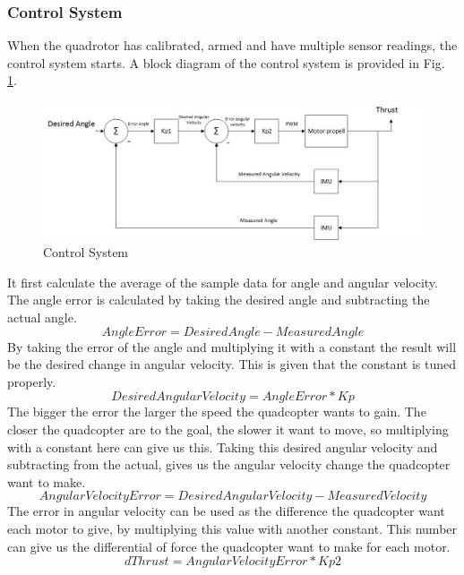 \subsubsection{Control System}
When the quadrotor has calibrated, armed and have multiple sensor readings, the control system starts. A block diagram of the control system is provided in Fig. \ref{fig:dir}.
\begin{figure}[H]
          \centering
            \includegraphics[scale = 0.62]{VAPIQ-PICTURES/CSBD.jpg}
                \caption{Control System}
                \label{CSBD}
            \label{fig:dir}
\end{figure} 
\noindent
It first calculate the average of the sample data for angle and angular velocity. The angle error is calculated by taking the desired angle and subtracting the actual angle. 
\begin{equation}
   Angle Error = Desired Angle - Measured Angle
\end{equation}
\noindent
By taking the error of the angle and multiplying it with a constant the result will be the desired change in angular velocity. This is given that the constant is tuned properly.
\begin{equation}
   Desired Angular Velocity = Angle Error * Kp
\end{equation}
\noindent
The bigger the error the larger the speed the quadcopter wants to gain. The closer the quadcopter are to the goal, the slower it want to move, so multiplying with a constant here can give us this. Taking this desired angular velocity and subtracting from the actual, gives us the angular velocity change the quadcopter want to make.
\begin{equation}
   Angular Velocity Error = Desired Angular Velocity - Measured Velocity
\end{equation}
\noindent
The error in angular velocity can be used as the difference the quadcopter want each motor to give, by multiplying this value with another constant. This number can give us the differential of force the quadcopter want to make for each motor. \\
\begin{equation}
   dThrust =   Angular Velocity Error * Kp2
\end{equation}
\noindent

